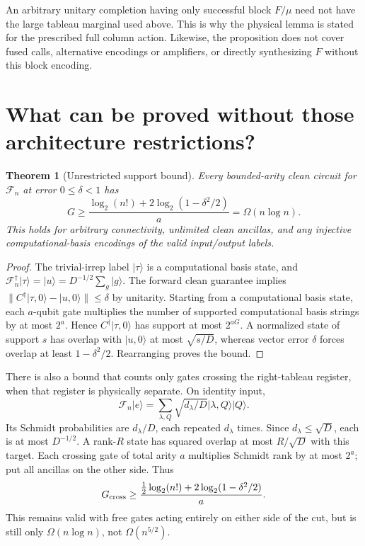 \documentclass[11pt]{article}
\newtheorem{theorem}{Theorem}
\theoremstyle{definition}
\newcommand{\ket}[1]{\lvert #1\rangle}
\newcommand{\norm}[1]{\lVert #1\rVert}
\newcommand{\F}{\mathcal F}
\begin{document}
An arbitrary unitary completion having only successful block $F/\mu$
need not have the large tableau marginal used above. This is why the
physical lemma is stated for the prescribed full column action. Likewise,
the proposition does not cover fused calls, alternative encodings or
amplifiers, or directly synthesizing $F$ without this block encoding.

\section{What can be proved without those architecture restrictions?}

\begin{theorem}[Unrestricted support bound]\label{thm:general}
Every bounded-arity clean circuit for $\F_n$ at error $0\le\delta<1$
has
\[
 G\ge\frac{\log_2(n!)+2\log_2(1-\delta^2/2)}a
 =\Omega(n\log n).
\]
This holds for arbitrary connectivity, unlimited clean ancillas, and any
injective computational-basis encodings of the valid input/output labels.
\end{theorem}
\begin{proof}
The trivial-irrep label $\ket\tau$ is a computational basis state, and
$\F_n^\dagger\ket\tau=\ket u=D^{-1/2}\sum_g\ket g$.
The forward clean guarantee implies
$\norm{C^\dagger\ket{\tau,0}-\ket{u,0}}\le\delta$ by unitarity.
Starting from a computational basis state, each $a$-qubit gate multiplies
the number of supported computational basis strings by at most $2^a$.
Hence $C^\dagger\ket{\tau,0}$ has support at most $2^{aG}$.
A normalized state of support $s$ has overlap with $\ket{u,0}$ at most
$\sqrt{s/D}$, whereas vector error $\delta$ forces overlap at least
$1-\delta^2/2$. Rearranging proves the bound.
\end{proof}

There is also a bound that counts only gates crossing the right-tableau
register, when that register is physically separate. On identity input,
\[
 \F_n\ket e=\sum_{\lambda,Q}\sqrt{d_\lambda/D}
       \ket{\lambda,Q}\ket Q.
\]
Its Schmidt probabilities are $d_\lambda/D$, each repeated $d_\lambda$
times. Since $d_\lambda\le\sqrt D$, each is at most $D^{-1/2}$.
A rank-$R$ state has squared overlap at most $R/\sqrt D$ with this target.
Each crossing gate of total arity $a$ multiplies Schmidt rank by at most
$2^a$; put all ancillas on the other side. Thus
\[
 G_{\rm cross}\ge
 \frac{\tfrac12\log_2(n!)+2\log_2(1-\delta^2/2)}a.
\]
This remains valid with free gates acting entirely on either side of the
cut, but is still only
$\Omega(n\log n)$, not $\Omega(n^{5/2})$.
\end{document}
